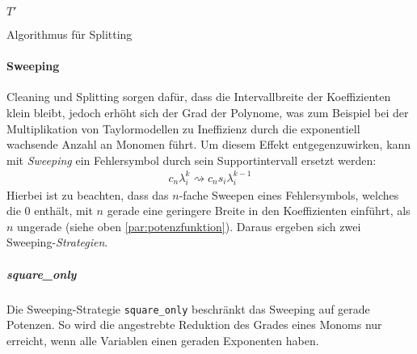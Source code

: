 \begin{algorithm}[H]
\label{algo:split}
\SetAlgoLined
{}
\DontPrintSemicolon
{}

\Return $T'$ 
 \caption{Algorithmus für Splitting}
\end{algorithm}




\paragraph{Sweeping}
Cleaning und Splitting sorgen dafür, dass die Intervallbreite der Koeffizienten klein bleibt, jedoch erhöht sich der Grad der Polynome, was zum Beispiel bei der Multiplikation von Taylormodellen zu Ineffizienz durch die exponentiell wachsende Anzahl an Monomen führt. Um diesem Effekt entgegenzuwirken, kann mit \textit{Sweeping} ein Fehlersymbol durch sein Supportintervall ersetzt werden:
\begin{align*}
 c_n \lambda_i^k \rightsquigarrow c_n s_i \lambda_i^{k-1}
\end{align*}
Hierbei ist zu beachten, dass das $n$-fache Sweepen eines Fehlersymbols, welches die 0 enthält, mit $n$ gerade eine geringere Breite in den Koeffizienten einführt, als $n$ ungerade (siehe oben \ref{par:potenzfunktion}). Daraus ergeben sich zwei Sweeping-\textit{Strategien}.

\subparagraph{square\_only}
Die Sweeping-Strategie \verb+square_only+ beschränkt das Sweeping auf gerade Potenzen. So wird die angestrebte Reduktion des Grades eines Monoms nur erreicht, wenn alle Variablen einen geraden Exponenten haben.


